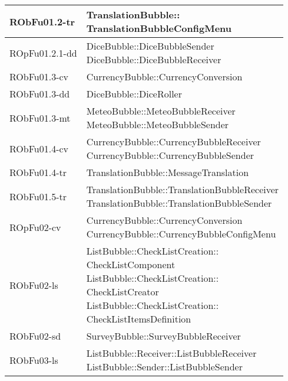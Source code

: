 \begin{center}
\begin{longtable}{|
*{1}{>{\centering\arraybackslash}m{2.5cm}|}
*{1}{>{\centering\arraybackslash}m{7.5cm}|}}
RObFu01.2-tr & \makecell[l]{TranslationBubble:: \\ \hfill TranslationBubbleConfigMenu
\\}\\\hline
ROpFu01.2.1-dd & \makecell[l]{DiceBubble::DiceBubbleSender
\\DiceBubble::DiceBubbleReceiver
\\}\\\hline
RObFu01.3-cv & \makecell[l]{CurrencyBubble::CurrencyConversion
\\}\\\hline
RObFu01.3-dd & \makecell[l]{DiceBubble::DiceRoller
\\}\\\hline
RObFu01.3-mt & \makecell[l]{MeteoBubble::MeteoBubbleReceiver
\\MeteoBubble::MeteoBubbleSender
\\}\\\hline
RObFu01.4-cv & \makecell[l]{CurrencyBubble::CurrencyBubbleReceiver
\\CurrencyBubble::CurrencyBubbleSender
\\}\\\hline
RObFu01.4-tr & \makecell[l]{TranslationBubble::MessageTranslation
\\}\\\hline
RObFu01.5-tr & \makecell[l]{TranslationBubble::TranslationBubbleReceiver
\\TranslationBubble::TranslationBubbleSender
\\}\\\hline
ROpFu02-cv & \makecell[l]{CurrencyBubble::CurrencyConversion
\\CurrencyBubble::CurrencyBubbleConfigMenu
\\}\\\hline
RObFu02-ls & \makecell[l]{ListBubble::CheckListCreation:: \\ \hfill CheckListComponent
\\ListBubble::CheckListCreation:: \\ \hfill CheckListCreator
\\ListBubble::CheckListCreation:: \\ \hfill CheckListItemsDefinition
\\}\\\hline
RObFu02-sd & \makecell[l]{SurveyBubble::SurveyBubbleReceiver
\\}\\\hline
RObFu03-ls & \makecell[l]{ListBubble::Receiver::ListBubbleReceiver
\\ListBubble::Sender::ListBubbleSender
}
\end{longtable}
\end{center}
